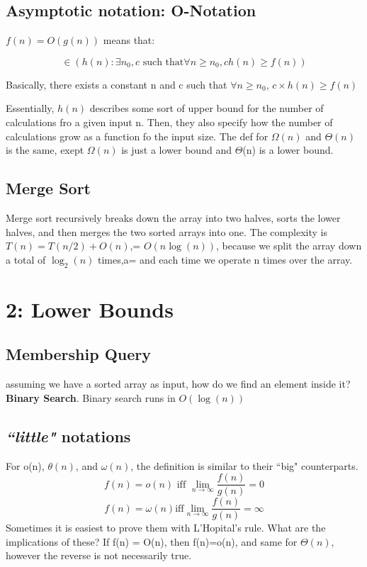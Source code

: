 \documentclass[portrait,10pt,a4paper]{article}
\begin{document}
\begin{multicols*}{3}
\subsection{Asymptotic notation: O-Notation}
$f(n) = O(g(n))$ means that: 

		\[ \in (h(n) : \exists n_{0},c \text{ such that}
		\forall n\geq n_{0}, ch(n)\geq f(n))\]

Basically, there exists a constant n and c such that $\forall n\geq n_{0}$,
$c \times h(n)\geq f(n)$

Essentially, $h(n)$ describes some sort of upper bound for the number of calculations fro a given input n.
Then, they also specify how the number of calculations grow as a function fo the input size. The def 
for $\Omega(n)$ and $\Theta(n)$ is the same, exept $\Omega(n)$ is just a lower bound and $\Theta$(n) is 
a lower bound.
\subsection{Merge Sort}
Merge sort recursively breaks down the array into two halves, sorts the lower halves, and then merges the two 
sorted arrays into one. The complexity is $T(n) = T(n/2) + O(n)$,= $O(n \log(n))$, because we split
the array down a total of $\log_{2}(n)$ times,a= and each time we operate n times over the array.

\section{2: Lower Bounds}
\subsection{Membership Query}
assuming we have a sorted array as input, how do we find an element inside it? \textbf{Binary Search}.
Binary search runs in $O(\log(n))$
\subsection{\textit{``little"} notations}
For o(n), $\theta(n)$, and $\omega(n)$, the definition is similar to their ``big" counterparts. 
		$$f(n) = o(n) \text{ iff } \lim_{n\to\infty}\frac{f(n)}{g(n)}=0$$
		$$f(n) = \omega(n) \text{iff} \lim_{n\to\infty}\frac{f(n)}{g(n)}=\infty$$ 
Sometimes it is easiest to prove them with L'Hopital's rule.
What are the implications of these?
If f(n) = O(n), then f(n)=o(n), and same for $\Theta(n)$, however the reverse is not necessarily true.


\end{multicols*}
\end{document}
